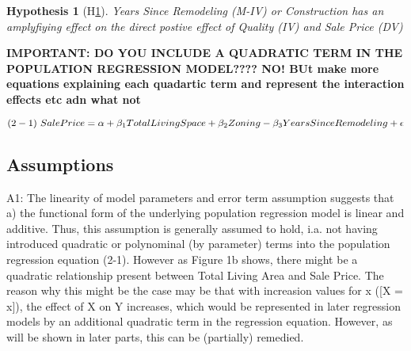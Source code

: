 \documentclass[a4paper]{article}
\newtheorem{hyp}{Hypothesis}
\begin{document}
\begin{hyp}[H\ref{hyp:third}] \label{hyp:third}
Years Since Remodeling (M-IV) or Construction has an amplyfiying effect on the direct postive effect of Quality (IV) and Sale Price (DV)
\end{hyp}

\begin{center}
\end{center}




\textbf{IMPORTANT: DO YOU INCLUDE A QUADRATIC TERM IN THE POPULATION REGRESSION MODEL???? NO! BUt make more equations explaining each quadartic term and represent the interaction effects etc adn what not }

$$ (2-1)   \\\   {SalePrice} = \alpha + \beta_{1} TotalLivingSpace + \beta_{2}  Zoning - \beta_{3}  YearsSinceRemodeling +\epsilon$$



\subsection{Assumptions}


\indent A1: The linearity of model parameters and error term assumption suggests that a) the functional form of the underlying population regression model is linear and additive. Thus, this assumption is generally assumed to hold, i.a. not having introduced quadratic or polynominal (by parameter) terms into the population regression equation (2-1). However as Figure 1b shows, there might be a quadratic relationship present between Total Living Area and Sale Price. The reason why this might be the case may be that with increasion values for x ([X = x]), the effect of X on Y increases, which would be represented in later regression models by an additional quadratic term in the regression equation. However, as will be shown in later parts, this can be (partially) remedied.
\end{document}
